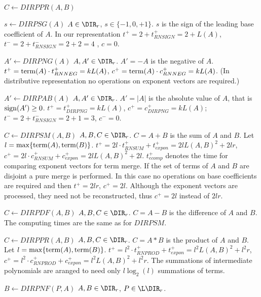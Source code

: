 \begin{deflist}{$C \gets DIRPPR(A,B)$}
\item[$s \gets DIRPSG(A)$] $A \in \DIR_r$, $s \in \{ -1, 0, +1\}$. 
     $s$ is the sign of the leading base coefficient 
     of $A$.
     In our representation 
     $t^+ = 2 + t^+_{RNSIGN} = 2 + L(A)$, 
     $t^- = 2 + t^-_{RNSIGN} = 2 + 2 = 4$ , $c = 0$.  
\item[$A' \gets DIRPNG(A)$] $A, A' \in \DIR_r$. 
     $A' = - A$ is the negative of $A$.
     $t^+ = {\rm term}(A) \cdot t^+_{RNNEG} = k L(A)$, 
     $c^+ = {\rm term}(A) \cdot c^+_{RNNEG} = k L(A)$.  
     (In distributive representation no operations on 
     exponent vectors are required.)
\item[$A' \gets DIRPAB(A)$] $A, A' \in \DIR_r$. 
     $A' = \vert A \vert$ is the absolute value of $A$, 
     that is ${\rm sign}(A') \geq 0$.
     $t^+ = t^+_{DIRPNG} = k L(A)$, 
     $c^+ = c^+_{DIRPNG} = k L(A)$;  
     $t^- = 2 + t^-_{RNSIGN} = 2 + 1 = 3$, 
     $c^- = 0$.
\item[$C \gets DIRPSM(A,B)$] $A, B, C \in \DIR_r$. 
     $C = A + B$ is the sum of $A$ and $B$.
     Let $l = \max \{ {\rm term}(A), {\rm term}(B) \}$. 
     $t^+ = 2 l \cdot t^+_{RNSUM} + t^+_{expon} 
     = 2 l L(A,B)^2 + 2 l r$, 
     $c^+ = 2 l \cdot c^+_{RNSUM}  + c^+_{expon} 
     = 2 l L(A,B)^2 + 2 l$. 
     $t^+_{ecomp}$ denotes the time for comparing exponent 
     vectors for term merge.
     If the set of terms of $A$ and $B$ are disjoint 
     a pure merge is performed. In this case no operations 
     on base coefficients are required 
     and then $t^+ = 2 l r$, $c^+ = 2 l$.
     Although the exponent vectors are processed, they need not 
     be reconstructed, thus $c^+ = 2 l$ instead of $2 l r$.
\item[$C \gets DIRPDF(A,B)$] $A, B, C \in \DIR_r$. 
     $C = A - B$ is the difference of $A$ and $B$.
     The computing times are the same as for $DIRPSM$.
\item[$C \gets DIRPPR(A,B)$] $A, B, C \in \DIR_r$. 
     $C = A * B$ is the product of $A$ and $B$.
     Let $l = \max \{ {\rm term}(A), {\rm term}(B) \}$. 
     $t^+ = l^2 \cdot t^+_{RNPROD} + t^+_{expon} 
     = l^2 L(A,B)^2 + l^2 r$, 
     $c^+ = l^2 \cdot c^+_{RNPROD} + c^+_{expon} 
     = l^2 L(A,B)^2 + l^2 r$.  
     The summations of intermediate polynomials 
     are aranged to need only $l \log_2(l)$ summations
     of terms.
\item[$B \gets DIRPNF(P,A)$] $A, B \in \DIR_r$, $P \in \L\DIR_r$. 

\end{deflist}
